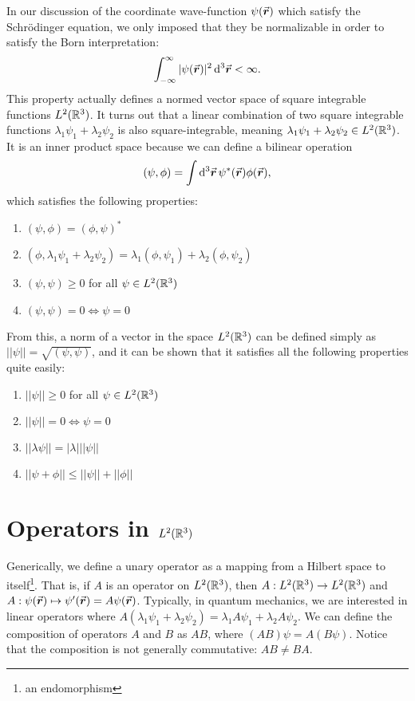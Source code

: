 In our discussion of the coordinate wave-function $\psi(\va*{r})$ which satisfy the Schr\"{o}dinger equation, we only imposed that they be normalizable in order to satisfy the Born interpretation:
\begin{eqnarray}
    \int_{-\infty}^{\infty} |\psi(\va*{r})|^2 \dd[3]{\va*{r}} < \infty
.\end{eqnarray}
This property actually defines a normed vector space of square integrable functions $L^2(\mathbb{R}^3)$.
It turns out that a linear combination of two square integrable functions $\lambda_1 \psi_1 + \lambda_2 \psi_2$ is also square-integrable, meaning $\lambda_1 \psi_1 + \lambda_2 \psi_2 \in L^2(\mathbb{R}^3)$.
It is an inner product space because we can define a bilinear operation
\begin{eqnarray}
    (\psi,\phi) = \int \dd[3]{\va*{r}} \psi^{*}(\va*{r}) \phi(\va*{r})
,\end{eqnarray}
which satisfies the following properties:
\begin{enumerate}
    \item $(\psi,\phi) = (\phi,\psi)^{*}$
    \item $(\phi,\lambda_1 \psi_1 + \lambda_2 \psi_2) = \lambda_1 (\phi,\psi_1) + \lambda_2 (\phi,\psi_2)$
    \item $(\psi,\psi) \geq 0$ for all $\psi \in L^2(\mathbb{R}^3)$
    \item $(\psi,\psi) = 0 \Leftrightarrow \psi = 0$
\end{enumerate}
From this, a norm of a vector in the space $L^2(\mathbb{R}^3)$ can be defined simply as $|| \psi || = \sqrt{(\psi,\psi)}$, and it can be shown that it satisfies all the following properties quite easily:
\begin{enumerate}
    \item $|| \psi || \geq 0$ for all $\psi \in L^2(\mathbb{R}^3)$
    \item $|| \psi || = 0 \Leftrightarrow \psi = 0$
    \item $|| \lambda \psi || = |\lambda| ||\psi||$
    \item $|| \psi + \phi || \leq || \psi || + || \phi || $
\end{enumerate}


\section{Operators in $L^2(\mathbb{R}^3)$}

Generically, we define a unary operator as a mapping from a Hilbert space to itself\footnote{an endomorphism}.
That is, if $A$ is an operator on $L^2(\mathbb{R}^3)$, then $A: L^2(\mathbb{R}^3) \rightarrow L^2(\mathbb{R}^3)$ and $A: \psi(\va*{r}) \mapsto \psi'(\va*{r}) = A\psi(\va*{r})$.
Typically, in quantum mechanics, we are interested in linear operators where $A ( \lambda_1 \psi_1 + \lambda_2 \psi_2 ) = \lambda_1 A \psi_1 + \lambda_2 A \psi_2$.
We can define the composition of operators $A$ and $B$ as $AB$, where $(AB)\psi = A(B \psi)$.
Notice that the composition is not generally commutative: $AB \ne BA$.

